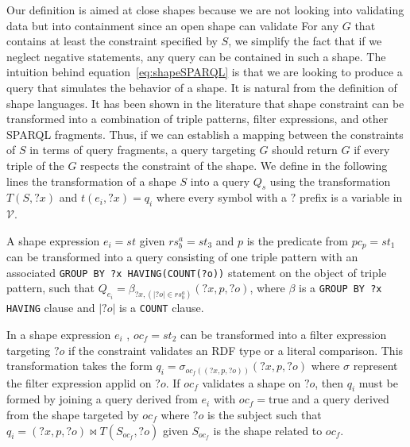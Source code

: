 Our definition is aimed at close shapes because we are not looking into validating data but into containment since an open shape can validate 
For any $G$ that contains at least the constraint specified by $S$, we simplify the fact that if we neglect negative statements, any query can be contained in such a shape.
The intuition behind equation~\ref{eq:shapeSPARQL} is that we are looking to produce a query that simulates the behavior of a shape.
It is natural from the definition of shape languages. It has been shown in the literature that shape constraint can be transformed into a combination of triple patterns, filter expressions, and other SPARQL fragments.
Thus, if we can establish a mapping between the constraints of $S$ in terms of query fragments, a query targeting $G$ should return $G$ if every triple of the 
$G$ respects the constraint of the shape.
\fi
We define in the following lines the transformation of a shape $S$ into a query $Q_s$ using the transformation $T(S,?x)$ and $t(e_i, ?x) = q_i$ where every 
symbol with a $?$ prefix is a variable in $\mathcal{V}$.

\iffalse
INSPIRE YOURSELF BY Corman2019 style

We might want to reference that

https://labra.weso.es/publication/2023_kg_subsets_pregel/
https://labra.weso.es/publication/2024_extracting_shapes_consolidator/

https://labra.weso.es/publication/2023_rdf_data_integration/

ssf_project Maxime

https://github.com/MaximeJakubowski/ssf_project/blob/master/ssf/sparql_conformance.py

\fi

\begin{prop}\label{prop:triplePattern}
   A shape expression $e_i = st$ given $rs^a_b = st_3$ and $p$ is the predicate from $pc_p = st_1$
   can be transformed into a query consisting of one triple pattern with an associated \texttt{GROUP BY ?x HAVING(COUNT(?o))} statement on the object of triple pattern,
   such that
   $Q_{e_i} = \beta_{?x, (|?o| \in rs^a_b)}(?x, p, ?o)$,
   where $\beta$ is a \texttt{GROUP BY ?x HAVING} clause and $|?o|$ is a \texttt{COUNT} clause. 
\end{prop}

\begin{prop}
   In a shape expression $e_i$ , $oc_f = st_2$ can be transformed into a filter expression targeting $?o$ if the constraint validates an RDF type or a literal comparison.
   This transformation takes the form $q_{i} = \sigma_{oc_f((?x, p, ?o))}(?x, p, ?o)$ where $\sigma$ represent the filter expression applid on $?o$.
   If $oc_f$ validates a shape on $?o$, then $q_i$ must be formed by joining a query derived from $e_i$ with $oc_f = \mathrm{true}$ and a query derived from the shape targeted by $oc_f$ 
   where $?o$ is the subject such that $q_{i}= (?x, p, ?o) \bowtie T(S_{oc_f},?o)$ given $S_{oc_f}$ is the shape related to $oc_f$.
\end{prop}

